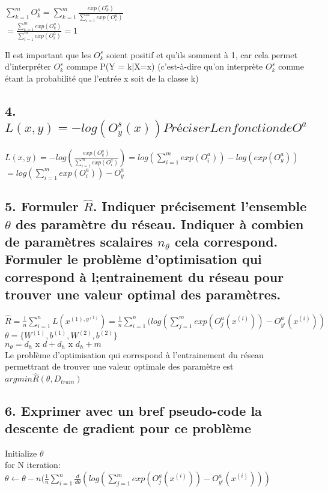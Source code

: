 \documentclass[12pt]{article}
\begin{document}
$\sum_{k=1}^{m}O_{k}^{s} = \sum_{k=1}^{m}\frac{exp(O_{k}^{a})}{\sum_{i=1}^{m}exp(O_{i}^{a})}$\\
$ = \frac{\sum_{k=1}^{m}exp(O_{k}^{a})}{\sum_{i=1}^{m}exp(O_{i}^{a})} = 1$

Il est important que les $O_{k}^{s}$ soient positif et qu'ils somment à 1, car cela permet d'interpréter $O_{k}^{s}$ commpe P(Y = k|X=x) (c'est-à-dire
qu'on interprète $O_{k}^{s}$ comme étant la probabilité que l'entrée x soit de la classe k)

 \subsection{4. $L(x,y) =  - log(O_{y}^{s}(x)) Préciser L en fonction de O^{a}$}

$L(x,y) = -log( \frac{exp(O_{k}^{a})}{\sum_{i=1}^{m}exp(O_{i}^{a})}) = log(\sum_{i=1}^{m}exp(O_{i}^{a})) - log(exp(O_{y}^{a}))$\\
$= log(\sum_{i=1}^{m}exp(O_{i}^{a})) - O_{y}^{a}$


 \subsection{5. Formuler $\hat{R}$. Indiquer précisement l'ensemble $\theta$ des paramètre du réseau. Indiquer à combien de paramètres scalaires $n_{\theta}$ cela correspond. Formuler le problème d'optimisation qui correspond à l;entrainement du réseau pour trouver une valeur optimal des paramètres.}

$\hat{R} = \frac{1}{n}\sum_{i=1}^{n}L(x^{(1), y^{(1)}}) = \frac{1}{n}\sum_{i=1}^{n}(log(\sum_{j=1}^{m}exp(O_{j}^{a}(x^{(i)}))-O_{y^{i}}^{a}(x^{(i)}))$\\

$\theta = \{W^{(1)}, b^{(1)}, W^{(2)}, b^{(2)}\}$\\

$n_{\theta} = d_{h}\text{ x }d + d_{h} \text{ x } d_{h} +m$ \\

Le problème d'optimisation qui correspond à l'entrainement du réseau permettrant de trouver une valeur optimale des paramètre est $argmin\hat{R}(\theta, D_{train})$

 \subsection{6. Exprimer avec un bref pseudo-code la descente de gradient pour ce problème}
Initialize $\theta$\\
for N iteration:\\
$\theta \leftarrow \theta-n(\frac{1}{n}\sum_{i=1}^{n}\frac{d}{d\theta}(log(\sum_{j=1}^{m}exp(O_{j}^{a}(x^{(i)}))-O_{y^{i}}^{a}(x^{(i)})))$
\end{document}
